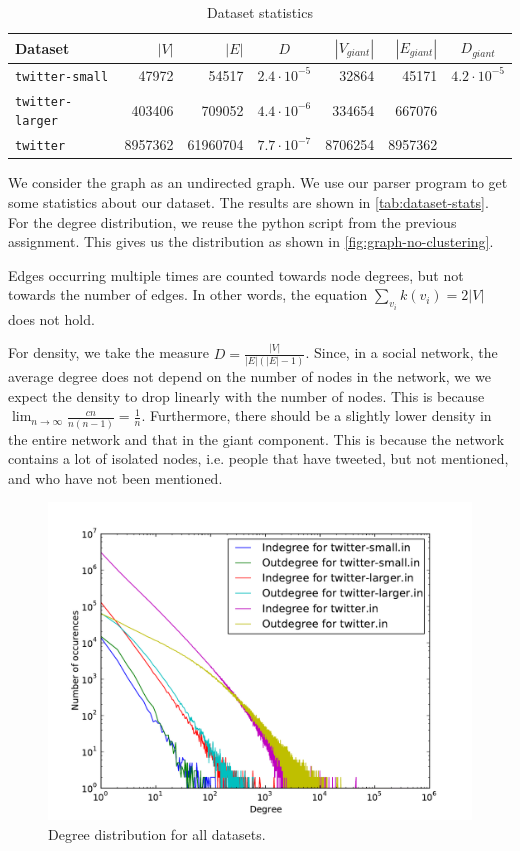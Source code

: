 \documentclass[a4paper,10pt,hidelinks]{article}
\begin{document}
\begin{table}
	\centering
	\begin{tabular}{l || r | r | c | r | r | c}
		Dataset & $|V|$ & $|E|$ & $D$ & $|V_{giant}|$ & $|E_{giant}|$ & $D_{giant}$ \\
		\hline
		\texttt{twitter-small} & 47972 & 54517 & $2.4 \cdot 10^{-5}$ & 32864 & 45171 & $4.2 \cdot 10^{-5}$ \\
		\texttt{twitter-larger} & 403406 & 709052 & $4.4 \cdot 10^{-6}$ & 334654 & 667076 \\
		\texttt{twitter} & 8957362 & 61960704 & $7.7 \cdot  10^{-7}$ & 8706254 & 8957362
	\end{tabular}
	\caption{Dataset statistics}
	\label{tab:dataset-stats}
\end{table}

We consider the graph as an undirected graph. We use our parser program to get some statistics about our dataset. The results are shown in \autoref{tab:dataset-stats}. For the degree distribution, we reuse the python script from the previous assignment. This gives us the distribution as shown in \autoref{fig:graph-no-clustering}.

Edges occurring multiple times are counted towards node degrees, but not towards the number of edges. In other words, the equation $\sum\limits_{v_i} k(v_i) = 2|V|$ does not hold.

For density, we take the measure $D = \frac{|V|}{|E|(|E| - 1)}$. Since, in a social network, the average degree does not depend on the number of nodes in the network, we we expect the density to drop linearly with the number of nodes. This is because $\lim_{n \rightarrow \infty} \frac{cn}{n (n - 1)} = \frac{1}{n}$. Furthermore, there should be a slightly lower  density in the entire network and that in the giant component. This is because the network contains a lot of isolated nodes, i.e. people that have tweeted, but not mentioned, and who have not been mentioned.

\begin{figure}
	\centering
	\includegraphics[scale=0.8]{degree-distributions.pdf}
	\caption{Degree distribution for all datasets.}
\end{figure}
\end{document}

